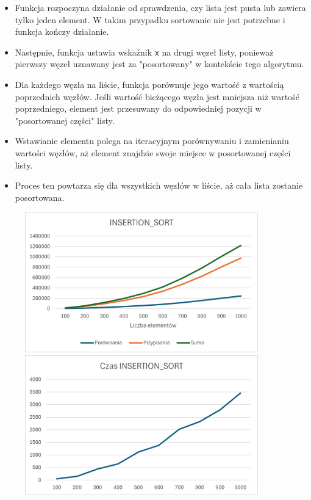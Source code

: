\documentclass{article}
\begin{document}
			\begin{itemize}
				\item Funkcja rozpoczyna działanie od sprawdzenia, czy lista jest pusta lub zawiera tylko jeden element. W takim przypadku sortowanie nie jest potrzebne i funkcja kończy działanie.
				\item Następnie, funkcja ustawia wskaźnik \texttt{x} na drugi węzeł listy, ponieważ pierwszy węzeł uznawany jest za "posortowany" w kontekście tego algorytmu.
				\item Dla każdego węzła na liście, funkcja porównuje jego wartość z wartością poprzednich węzłów. Jeśli wartość bieżącego węzła jest mniejsza niż wartość poprzedniego, element jest przesuwany do odpowiedniej pozycji w "posortowanej części" listy.
				\item Wstawianie elementu polega na iteracyjnym porównywaniu i zamienianiu wartości węzłów, aż element znajdzie swoje miejsce w posortowanej części listy.
				\item Proces ten powtarza się dla wszystkich węzłów w liście, aż cała lista zostanie posortowana.
			\end{itemize}
			
			\begin{figure}[H]
				\centering
				\includegraphics[width=0.9\textwidth]{IS1.png}
				\includegraphics[width=0.9\textwidth]{IS2.png}
			\end{figure}
			
\end{document}
